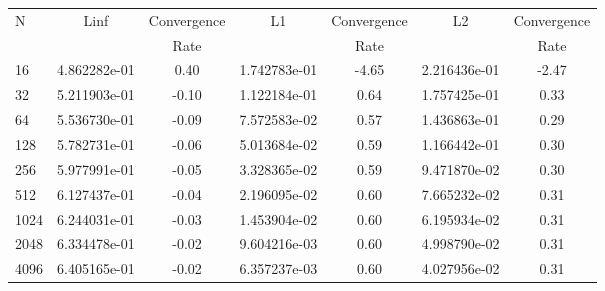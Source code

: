 \documentclass[12pt]{article}
\begin{document}
	\begin{tabular}{l|c|c|c|c|c|c}
		N&Linf&Convergence&L1&Convergence&L2&Convergence\\
		&&Rate&&Rate&&Rate\\
		\hline
		16&4.862282e-01&0.40&1.742783e-01&-4.65&2.216436e-01&-2.47\\
		\hline
		32&5.211903e-01&-0.10&1.122184e-01&0.64&1.757425e-01&0.33\\
		\hline
		64&5.536730e-01&-0.09&7.572583e-02&0.57&1.436863e-01&0.29\\
		\hline
		128&5.782731e-01&-0.06&5.013684e-02&0.59&1.166442e-01&0.30\\
		\hline
		256&5.977991e-01&-0.05&3.328365e-02&0.59&9.471870e-02&0.30\\
		\hline
		512&6.127437e-01&-0.04&2.196095e-02&0.60&7.665232e-02&0.31\\
		\hline
		1024&6.244031e-01&-0.03&1.453904e-02&0.60&6.195934e-02&0.31\\
		\hline
		2048&6.334478e-01&-0.02&9.604216e-03&0.60&4.998790e-02&0.31\\
		\hline
		4096&6.405165e-01&-0.02&6.357237e-03&0.60&4.027956e-02&0.31\\
	\end{tabular}
\end{document}
